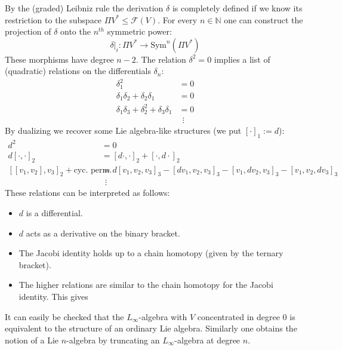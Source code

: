	By the (graded) Leibniz rule the derivation $\delta$ is completely defined if we know its restriction to the subspace $\Pi V^*\leq\mathcal{F}(V)$. For every $n\in\mathbb{N}$ one can construct the projection of $\delta$ onto the $n^{th}$ symmetric power: \[\delta|_i:\Pi V^*\rightarrow\text{Sym}^n(\Pi V^*)\] These morphisms have degree $n-2$. The relation $\delta^2=0$ implies a list of (quadratic) relations on the differentials $\delta_n$:
	\begin{align*}
		\delta_1^2 &= 0\\
		\delta_1\delta_2+\delta_2\delta_1 &= 0\\
		\delta_1\delta_3+\delta_2^2+\delta_3\delta_1 &= 0\\
		&\ \ \vdots
	\end{align*}
	By dualizing we recover some Lie algebra-like structures (we put $[\cdot]_1:=d$):
	\begin{align*}
		d^2&=0\\
		d[\cdot,\cdot]_2 &= [d\cdot,\cdot]_2+[\cdot,d\cdot]_2\\
		[[v_1,v_2],v_3]_2+\text{cyc. perm.} &= d[v_1,v_2,v_3]_3-[dv_1,v_2,v_3]_3-[v_1,dv_2,v_3]_3-[v_1,v_2,dv_3]_3\\
		&\ \ \vdots
	\end{align*}
	These relations can be interpreted as follows:
	\begin{itemize}
		\item $d$ is a differential.
		\item $d$ acts as a derivative on the binary bracket.
		\item The Jacobi identity holds up to a chain homotopy (given by the ternary bracket).
		\item The higher relations are similar to the chain homotopy for the Jacobi identity. This gives
	\end{itemize}

	
	\begin{example}
		It can easily be checked that the $L_\infty$-algebra with $V$ concentrated in degree 0 is equivalent to the structure of an ordinary Lie algebra. Similarly one obtains the notion of a Lie $n$-algebra by truncating an $L_\infty$-algebra at degree $n$.
	\end{example}
